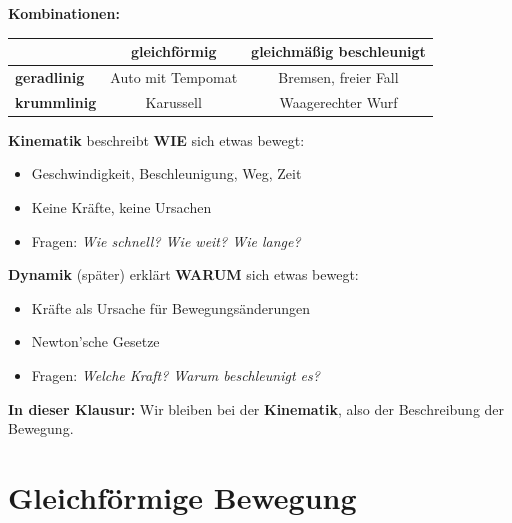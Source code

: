 \documentclass[11pt,a4paper]{article}
\begin{document}
\vspace{0.5cm}

\begin{center}
\textbf{Kombinationen:}\\[0.3cm]
\begin{tabular}{|l|c|c|}
\hline
\rowcolor{lightblue}
& \textbf{gleichförmig} & \textbf{gleichmäßig beschleunigt} \\
\hline
\textbf{geradlinig} & Auto mit Tempomat & Bremsen, freier Fall \\
\hline
\textbf{krummlinig} & Karussell & Waagerechter Wurf \\
\hline
\end{tabular}
\end{center}

\vspace{0.5cm}

\begin{tcolorbox}[colback=physikblue!5, colframe=physikblue, boxrule=1pt, title=\textbf{Kinematik und Dynamik: Was ist der Unterschied?}]
\textbf{Kinematik} beschreibt \textbf{WIE} sich etwas bewegt:
\begin{itemize}
\item Geschwindigkeit, Beschleunigung, Weg, Zeit
\item Keine Kräfte, keine Ursachen
\item Fragen: \textit{Wie schnell? Wie weit? Wie lange?}
\end{itemize}

\textbf{Dynamik} (später) erklärt \textbf{WARUM} sich etwas bewegt:
\begin{itemize}
\item Kräfte als Ursache für Bewegungsänderungen
\item Newton'sche Gesetze
\item Fragen: \textit{Welche Kraft? Warum beschleunigt es?}
\end{itemize}

\textbf{In dieser Klausur:} Wir bleiben bei der \textbf{Kinematik}, also der Beschreibung der Bewegung.
\end{tcolorbox}

\newpage

\section{Gleichförmige Bewegung}
\end{document}
